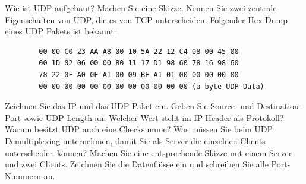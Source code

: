 \documentclass[ngerman,a4paper,12pt]{scrreprt}
\begin{document}
\olR
	\li Wie ist UDP aufgebaut? Machen Sie eine Skizze.
	\li Nennen Sie zwei zentrale Eigenschaften von UDP, die es von TCP unterscheiden.
	\li Folgender Hex Dump eines UDP Pakets ist bekannt: \\
	\begin{verbatim}
		00 00 C0 23 AA A8 00 10 5A 22 12 C4 08 00 45 00
		00 1D 02 06 00 00 80 11 17 D1 98 60 78 16 98 60
		78 22 0F A0 0F A1 00 09 BE A1 01 00 00 00 00 00
		00 00 00 00 00 00 00 00 00 00 00 00 (a byte UDP-Data)
	 \end{verbatim}
 		\ol
 			\li Zeichnen Sie das IP und das UDP Paket ein.
 			\li Geben Sie Source- und Destination-Port sowie UDP Length an.
 			\li Welcher Wert steht im IP Header als Protokoll?
 		\olE
	 \li Warum besitzt UDP auch eine Checksumme?
	 \li Was müssen Sie beim UDP Demultiplexing unternehmen, damit Sie als Server die einzelnen Clients unterscheiden können? Machen Sie eine entsprechende Skizze mit einem Server und zwei Clients. Zeichnen Sie die Datenflüsse ein und schreiben Sie alle Port-Nummern an.
\olS
\end{document}
